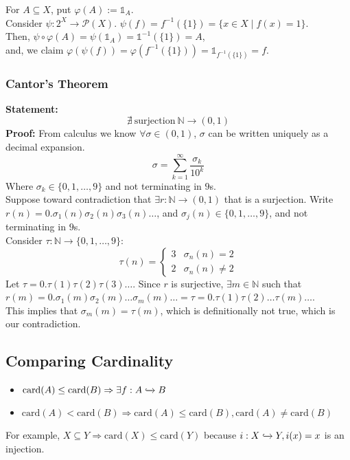 \documentclass[10pt]{extarticle}
\begin{document}
      For $A\subseteq X$, put $\varphi(A) := \mathbb{1}_A$.\\

      Consider $\psi: 2^X \rightarrow \mathcal{P}(X)$. $\psi(f) = f^{-1}(\{1\}) = \{x\in X \mid f(x) = 1\}$.\\

      Then, $\psi\circ\varphi(A) = \psi(\mathbb{1}_A) = \mathbb{1}^{-1}(\{1\}) = A$,\\

      and, we claim $\varphi(\psi(f)) = \varphi(f^{-1}(\{1\})) = \mathbb{1}_{f^{-1}(\{1\})} = f$.\\
    \subsubsection{Cantor's Theorem}%
    \textbf{Statement:}\[
        \nexists~\text{surjection}~\mathbb{N}\rightarrow (0,1)
      \] 
      \textbf{Proof:} From calculus we know $\forall \sigma\in (0,1)$, $\sigma$ can be written uniquely as a decimal expansion.
      \[
        \sigma = \sum_{k=1}^{\infty} \frac{\sigma_k}{10^k}
      \] 
      Where $\sigma_k\in \{0,1,\dots,9\}$ and not terminating in $9$s.\\

      Suppose toward contradiction that $\exists r:\mathbb{N} \rightarrow (0,1)$ that is a surjection. Write $r(n) = 0.\sigma_1(n)\sigma_2(n)\sigma_3(n)\dots$, and $\sigma_j(n) \in \{0,1,\dots,9\}$, and not terminating in $9$s.\\

      Consider $\tau: \mathbb{N} \rightarrow \{0,1,\dots,9\}$:
      \[
        \tau(n) = \begin{cases}
          3 & \sigma_n(n) = 2\\
          2 & \sigma_n(n) \neq 2
        \end{cases}
      \]
      Let $\tau = 0.\tau(1)\tau(2)\tau(3)\dots$. Since $r$ is surjective, $\exists m\in \mathbb{N}$ such that $r(m) = 0.\sigma_1(m)\sigma_2(m)\dots \sigma_m(m)\dots = \tau = 0.\tau(1)\tau(2)\dots\tau(m)\dots$.\\

      This implies that $\sigma_m(m) = \tau(m)$, which is definitionally not true, which is our contradiction.\\
    \subsection{Comparing Cardinality}%
    \begin{itemize}
      \item $\text{card}(A) \leq \text{card}(B) \Rightarrow \exists f: A\xhookrightarrow{} B$ 
      \item $\text{card}(A) < \text{card}(B) \Rightarrow \text{card}(A) \leq \text{card}(B), \text{card}(A) \neq \text{card}(B)$
    \end{itemize}
    For example, $X\subseteq Y \Rightarrow \text{card}(X) \leq \text{card}(Y)$ because $i: X\xhookrightarrow{} Y, i(x) = x$ is an injection.\\
\end{document}
